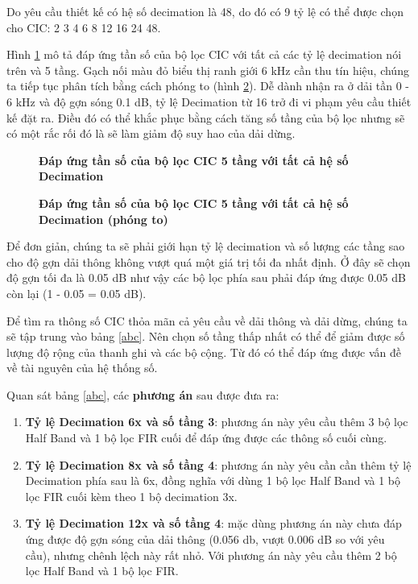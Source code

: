 Do yêu cầu thiết kế có hệ số decimation là 48, do đó có 9 tỷ lệ có thể được chọn cho CIC: 2 3 4 6 8 12 16 24 48.

Hình \ref{cic_ratios_overview} mô tả đáp ứng tần số của bộ lọc CIC với tất cả các tỷ lệ decimation nói trên và 5 tầng. Gạch nối màu đỏ biểu thị ranh giới 6 kHz cần thu tín hiệu, chúng ta tiếp tục phân tích bằng cách phóng to (hình \ref{cic_ratios_zoom}). Dễ dành nhận ra ở dải tần 0 - 6 kHz và độ gợn sóng 0.1 dB, tỷ lệ Decimation từ 16 trở đi vi phạm yêu cầu thiết kế đặt ra. Điều đó có thể khắc phục bằng cách tăng số tầng của bộ lọc nhưng sẽ có một rắc rối đó là sẽ làm giảm độ suy hao của dải dừng.

\begin{figure}[H]
    \centering
    
    \caption[Đáp ứng tần số của bộ lọc CIC 5 tầng với tất cả hệ số Decimation]{\bfseries \fontsize{12pt}{0pt}\selectfont Đáp ứng tần số của bộ lọc CIC 5 tầng với tất cả hệ số Decimation}
    \label{cic_ratios_overview}
\end{figure}

\begin{figure}[H]
    \centering
    
    \caption[Đáp ứng tần số của bộ lọc CIC 5 tầng với tất cả hệ số Decimation (phóng to)]{\bfseries \fontsize{12pt}{0pt}\selectfont Đáp ứng tần số của bộ lọc CIC 5 tầng với tất cả hệ số Decimation (phóng to)}
    \label{cic_ratios_zoom}
\end{figure}

Để đơn giản, chúng ta sẽ phải giới hạn tỷ lệ decimation và số lượng các tầng sao cho độ gợn dải thông không vượt quá một giá trị tối đa nhất định. Ở đây sẽ chọn độ gợn tối đa là 0.05 dB như vậy các bộ lọc phía sau phải đáp ứng được 0.05 dB còn lại (1 - 0.05 = 0.05 dB).

Để tìm ra thông số CIC thỏa mãn cả yêu cầu về dải thông và dải dừng, chúng ta sẽ tập trung vào bảng \ref{abc}. Nên chọn số tầng thấp nhất có thể để giảm được số lượng độ rộng của thanh ghi và các bộ cộng. Từ đó có thể đáp ứng được vấn đề về tài nguyên của hệ thống số.

 \noindent Quan sát bảng \ref{abc}, các \textbf{phương án} sau được đưa ra:
\begin{enumerate}
    \item \textbf{Tỷ lệ Decimation 6x và số tầng 3}: phương án này yêu cầu thêm 3 bộ lọc Half Band và 1 bộ lọc FIR cuối để đáp ứng được các thông số cuối cùng.
    \item \textbf{Tỷ lệ Decimation 8x và số tầng 4}: phương án này yêu cần cần thêm tỷ lệ Decimation phía sau là 6x, đồng nghĩa với dùng 1 bộ lọc Half Band và 1 bộ lọc FIR cuối kèm theo 1 bộ decimation 3x.
    \item \textbf{Tỷ lệ Decimation 12x và số tầng 4}: mặc dùng phương án này chưa đáp ứng được độ gợn sóng của dải thông (0.056 db, vượt 0.006 dB so với yêu cầu), nhưng chênh lệch này rất nhỏ. Với phương án này yêu cầu thêm 2 bộ lọc Half Band và 1 bộ lọc FIR. \label{choose}
\end{enumerate}

